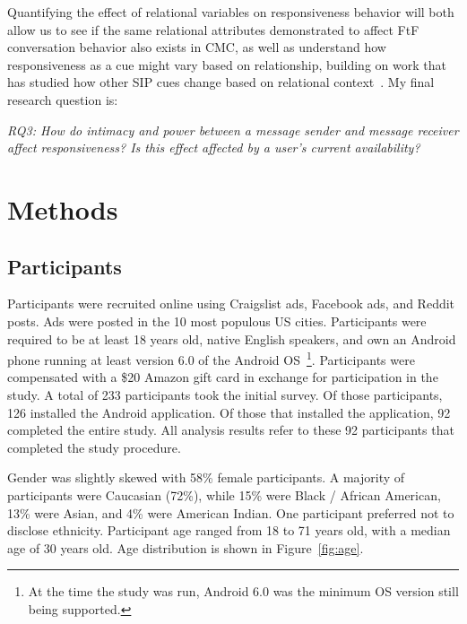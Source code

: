 \documentclass[12pt]{nuthesis}	%
\begin{document}
Quantifying the effect of relational variables on responsiveness behavior will both allow us to see if the same relational attributes demonstrated to affect FtF conversation behavior also exists in CMC, as well as understand how responsiveness as a cue might vary based on relationship, building on work that has studied how other SIP cues change based on relational context~\citep[e.g.,][]{hancock2007expressing}. My final research question is:

\textit{RQ3: How do intimacy and power between a message sender and message receiver affect responsiveness? Is this effect affected by a user's current availability?}


\chapter{Methods}

\section{Participants}

Participants were recruited online using Craigslist ads, Facebook ads, and Reddit posts. Ads were posted in the 10 most populous US cities. Participants were required to be at least 18 years old, native English speakers, and own an Android phone running at least version 6.0 of the Android OS~\footnote{At the time the study was run, Android 6.0 was the minimum OS version still being supported.}. Participants were compensated with a \$20 Amazon gift card in exchange for participation in the study. A total of 233 participants took the initial survey. Of those participants, 126 installed the Android application. Of those that installed the application, 92 completed the entire study. All analysis results refer to these 92 participants that completed the study procedure.

Gender was slightly skewed with 58\% female participants. A majority of participants were Caucasian (72\%), while 15\% were Black / African American, 13\% were Asian, and 4\% were American Indian. One participant preferred not to disclose ethnicity. Participant age ranged from 18 to 71 years old, with a median age of 30 years old. Age distribution is shown in Figure~\ref{fig:age}.
\end{document}
